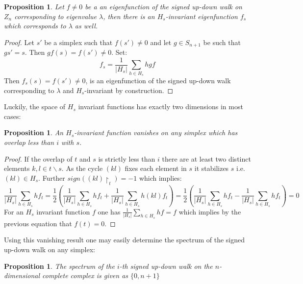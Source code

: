 \documentclass[11pt]{amsart}
\newtheorem{proposition}[theorem]{Proposition}
\begin{document}
    \begin{proposition}
        Let $f\neq 0$ be a an eigenfunction of the signed up-down walk on $Z_n$ corresponding to eigenvalue $\lambda$, then there is an $H_s$-invariant eigenfunction $f_s$ which corresponds to $\lambda$ as well.
    \end{proposition}
    \begin{proof}
        Let $s'$ be a simplex such that $f(s')\neq 0$ and let $g\in S_{n+1}$ be such that $gs'=s$. Then $gf(s)=f(s')\neq 0$. Set:
        \begin{equation}
            f_s=\frac{1}{|H_s|}\sum_{h\in H_s}hgf
        \end{equation}
        Then $f_s(s)=f(s')\neq 0$, is an eigenfunction of the signed up-down walk corresponding to $\lambda$ and $H_s$-invariant by construction.
    \end{proof}
    Luckily, the space of $H_s$ invariant functions has exactly two dimensions in most cases:
    \begin{proposition}
        An $H_s$-invariant function vanishes on any simplex which has overlap less than $i$ with $s$.
    \end{proposition}
    \begin{proof}
        If the overlap of $t$ and $s$ is strictly less than $i$ there are at least two distinct elements $k, l\in t\backslash s$. As the cycle $(kl)$ fixes each element in $s$ it stabilizes $s$ i.e. $(kl)\in H_s$. Further $sign((kl)\restriction_t)=-1$ which implies:
        \begin{equation}
            \frac{1}{|H_s|}\sum_{h\in H_s}hf_t=\frac{1}{2}\left(\frac{1}{|H_s|}\sum_{h\in H_s}hf_t+\frac{1}{|H_s|}\sum_{h\in H_s}h(kl)f_t\right)=\frac{1}{2}\left(\frac{1}{|H_s|}\sum_{h\in H_s}hf_t-\frac{1}{|H_s|}\sum_{h\in H_s}hf_t\right)=0
        \end{equation}
        For an $H_s$ invariant function $f$ one has $\frac{1}{|H_s|}\sum_{h\in H_s}hf=f$ which implies by the previous equation that $f(t)=0$.
    \end{proof}
    Using this vanishing result one may easily determine the spectrum of the signed up-down walk on any simplex:
    \begin{proposition}
        The spectrum of the $i$-th signed up-down walk on the $n$-dimensional complete complex is given as $\{0,n+1\}$
        \label{prop:UpDownSimplex}
    \end{proposition}
\end{document}
